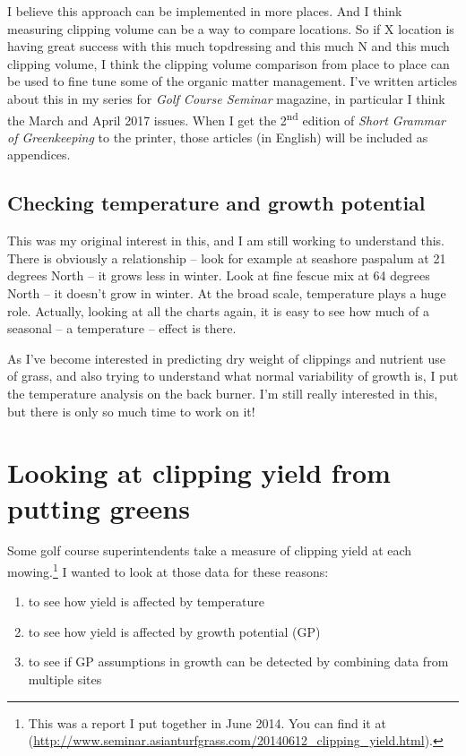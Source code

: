\documentclass[12pt,b5,]{tufte-book}
\providecommand{\tightlist}{%
  \setlength{\itemsep}{0pt}\setlength{\parskip}{0pt}}
\begin{document}
I believe this approach can be implemented in more places. And I think
measuring clipping volume can be a way to compare locations. So if X
location is having great success with this much topdressing and this
much N and this much clipping volume, I think the clipping volume
comparison from place to place can be used to fine tune some of the
organic matter management. I've written articles about this in my series
for \emph{Golf Course Seminar} magazine, in particular I think the March and
April 2017 issues. When I get the 2\textsuperscript{nd} edition of \emph{Short Grammar of
Greenkeeping} to the printer, those articles (in English) will be
included as appendices.

\hypertarget{checking-temperature-and-growth-potential}{%
\section{Checking temperature and growth potential}\label{checking-temperature-and-growth-potential}}

This was my original interest in this, and I am still working to
understand this. There is obviously a relationship -- look for example at
seashore paspalum at 21 degrees North -- it grows less in winter. Look at
fine fescue mix at 64 degrees North -- it doesn't grow in winter. At the
broad scale, temperature plays a huge role. Actually, looking at all the
charts again, it is easy to see how much of a seasonal -- a temperature --
effect is there.

As I've become interested in predicting dry weight of clippings and
nutrient use of grass, and also trying to understand what normal
variability of growth is, I put the temperature analysis on the back
burner. I'm still really interested in this, but there is only so much
time to work on it!

\hypertarget{report2014}{%
\chapter{Looking at clipping yield from putting greens}\label{report2014}}

Some golf course superintendents take a measure of clipping yield at each mowing.\footnote{This was a report I put together in June 2014. You can find it at (\url{http://www.seminar.asianturfgrass.com/20140612_clipping_yield.html}).} I wanted to look at those data for these reasons:

\begin{enumerate}
\def\labelenumi{\arabic{enumi}.}
\tightlist
\item
  to see how yield is affected by temperature
\item
  to see how yield is affected by growth potential (GP)
\item
  to see if GP assumptions in growth can be detected by combining data from multiple sites
\end{enumerate}
\end{document}
